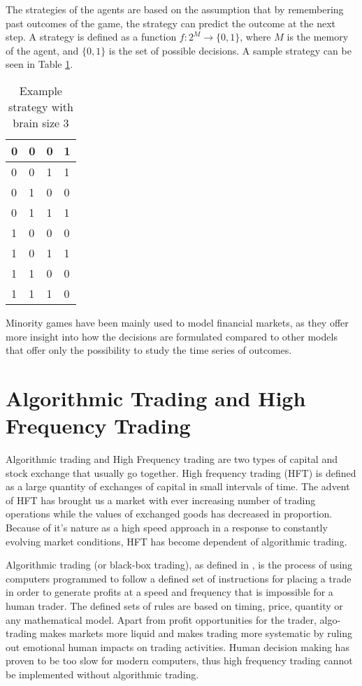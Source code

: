 The strategies of the agents are based on the assumption that by remembering past outcomes of the game, the strategy can predict the outcome at the next step.
A strategy is defined as a function $f:2^M\to\{0,1\}$, where $M$ is the memory of the agent, and $\{0,1\}$ is the set of possible decisions.
A sample strategy can be seen in Table \ref{table:minorityStrategy}.

\begin{table}
\centering
\begin{tabular}{|l|l|l||l|}
\hline
0 & 0 & 0 & 1   \\ \hline
0 & 0 & 1 & 1   \\ \hline
0 & 1 & 0 & 0   \\ \hline
0 & 1 & 1 & 1   \\ \hline
1 & 0 & 0 & 0   \\ \hline
1 & 0 & 1 & 1   \\ \hline
1 & 1 & 0 & 0   \\ \hline
1 & 1 & 1 & 0   \\ \hline
\end{tabular}
\caption{Example strategy with brain size 3}
\label{table:minorityStrategy}
\end{table}

Minority games have been mainly used to model financial markets, as they offer more insight into how the decisions are formulated compared to other models that offer only the possibility to study the time series of outcomes.


\section{Algorithmic Trading and High Frequency Trading}
\label{1:finance}
Algorithmic trading and High Frequency trading are two types of capital and stock exchange that usually go together.
High frequency trading (HFT) is defined as a large quantity of exchanges of capital in small intervals of time.
The advent of HFT has brought us a market with ever increasing number of trading operations while the values of exchanged goods has decreased in proportion.
Because of it's nature as a high speed approach in a response to constantly evolving market conditions, HFT has become dependent of algorithmic trading.

Algorithmic trading (or black-box trading), as defined in \cite{algotrading}, is the process of using computers programmed to follow a defined set of instructions for placing a trade in order to generate profits at a speed and frequency that is impossible for a human trader. 
The defined sets of rules are based on timing, price, quantity or any mathematical model. 
Apart from profit opportunities for the trader, algo-trading makes markets more liquid and makes trading more systematic by ruling out emotional human impacts on trading activities.
Human decision making has proven to be too slow for modern computers, thus high frequency trading cannot be implemented without algorithmic trading. 

